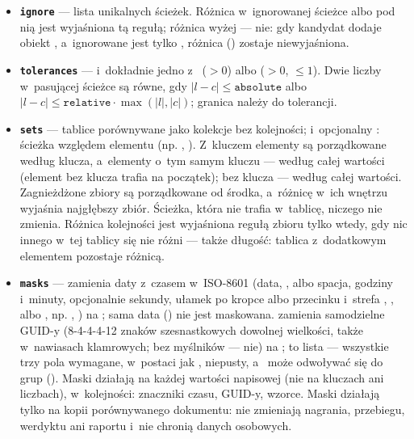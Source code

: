 \begin{itemize}
  \item \textbf{\texttt{ignore}} --- lista unikalnych ścieżek. Różnica w~ignorowanej ścieżce
        albo pod nią jest wyjaśniona tą regułą; różnica wyżej --- nie: gdy kandydat dodaje obiekt
        , a~ignorowane jest tylko , różnica
         () zostaje niewyjaśniona.
  \item \textbf{\texttt{tolerances}} ---  i~dokładnie jedno z~ ($> 0$) albo  ($> 0$, $\leq 1$). Dwie liczby w~pasującej ścieżce są równe, gdy $|l - c| \leq \texttt{absolute}$ albo
        $|l - c| \leq \texttt{relative} \cdot \max(|l|, |c|)$; granica należy do tolerancji.
  \item \textbf{\texttt{sets}} --- tablice porównywane jako kolekcje bez kolejności;
         i~opcjonalny : ścieżka względem elementu (np.
        , ). Z~kluczem elementy są porządkowane według klucza,
        a~elementy o~tym samym kluczu --- według całej wartości (element bez klucza trafia na
        początek); bez klucza --- według całej wartości. Zagnieżdżone zbiory są porządkowane od
        środka, a~różnicę w~ich wnętrzu wyjaśnia najgłębszy zbiór. Ścieżka, która nie trafia
        w~tablicę, niczego nie zmienia. Różnica kolejności jest wyjaśniona regułą zbioru tylko
        wtedy, gdy nic innego w~tej tablicy się nie różni --- także długość: tablica
        z~dodatkowym elementem pozostaje różnicą.
  \item \textbf{\texttt{masks}} ---  zamienia daty z~czasem w~ISO-8601
        (data, ,  albo spacja, godziny i~minuty, opcjonalnie sekundy,
        ułamek po kropce albo przecinku i~strefa , , 
        albo , np. ,
        ) na ; sama data
        () nie jest maskowana.  zamienia samodzielne GUID-y
        (8-4-4-4-12 znaków szesnastkowych dowolnej wielkości, także w~nawiasach klamrowych; bez
        myślników --- nie) na ;  to lista
         --- wszystkie trzy pola wymagane,
         w~postaci jak ,  niepusty,
        a~ może odwoływać się do grup (). Maski działają na
        każdej wartości napisowej (nie na kluczach ani liczbach), w~kolejności: znaczniki czasu,
        GUID-y, wzorce. Maski działają tylko na kopii porównywanego dokumentu: nie zmieniają
        nagrania, przebiegu, werdyktu ani raportu i~nie chronią danych osobowych.
\end{itemize}

